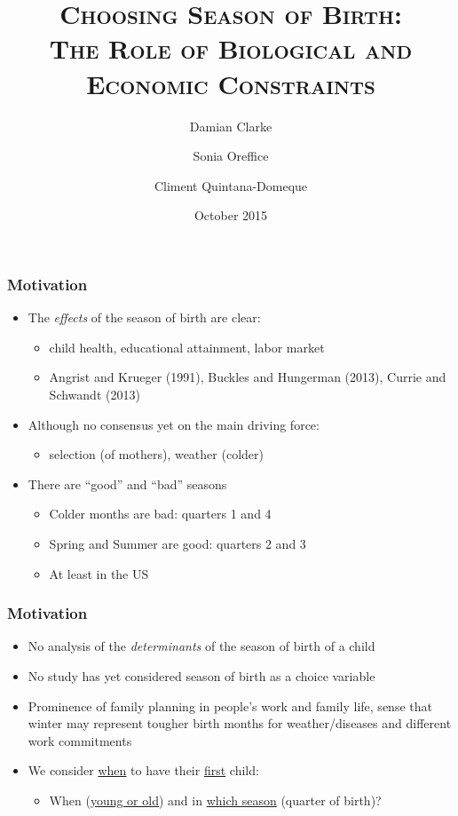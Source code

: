 \documentclass[10pt,letterpaper,subeqn]{beamer}
\title{\Large{\textsc{Choosing Season of Birth:}}\\ \Large{\textsc{The Role of Biological and Economic Constraints}}}
\author{Damian Clarke\inst{\S}
   \and Sonia Oreffice\inst{\diamond}
   \and Climent Quintana-Domeque\inst{*}}
\institute{\inst{\S}  University of Oxford
      \and \inst{\diamond} University of Surrey and IZA
      \and \inst{*}     University of Oxford and IZA}
\date{October 2015}
\begin{document}
\begin{frame}
\titlepage
\end{frame}

\begin{frame}[label=Motivation]
\frametitle{Motivation}

\begin{itemize}
\item The \emph{effects} of the season of birth are clear:
      \begin{itemize}
        \item child health, educational attainment, labor market
        \item Angrist and Krueger (1991), Buckles and Hungerman (2013), Currie and Schwandt (2013)
      \end{itemize}
\item Although no consensus yet on the main driving force:
      \begin{itemize}
        \item selection (of mothers), weather (colder)
      \end{itemize}
\item There are ``good'' and ``bad'' seasons
      \begin{itemize}
\item Colder months are bad: quarters 1 and 4
\item Spring and Summer are good: quarters 2 and 3
\item At least in the US
      \end{itemize}
\end{itemize}
\end{frame}

\begin{frame}[label=Motivation2]
\frametitle{Motivation}
\begin{itemize}
\item No analysis of the \emph{determinants} of the season of birth of a child
\item No study has yet considered season of birth as a choice variable
\item Prominence of family planning in people's work and family life, sense that winter may represent tougher birth months for weather/diseases and different work commitments
\item We consider \underline{when} to have their \underline{first} child:
\begin{itemize}
  \item When (\underline{young or old}) and in \underline{which season} (quarter of birth)?
\end{itemize}
\end{itemize}
\end{frame}
\end{document}
